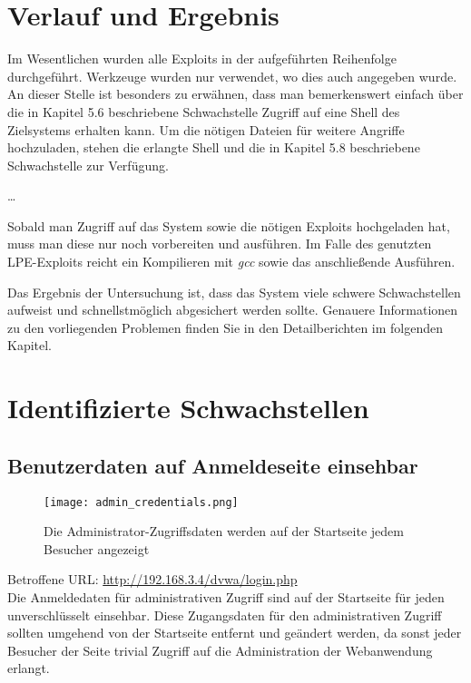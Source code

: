 \documentclass[a4paper, 12pt]{report}
\begin{document}
\chapter{Verlauf und Ergebnis}
Im Wesentlichen wurden alle Exploits in der aufgeführten Reihenfolge durchgeführt.
Werkzeuge wurden nur verwendet, wo dies auch angegeben wurde.
An dieser Stelle ist besonders zu erwähnen, dass man bemerkenswert einfach über die
in Kapitel 5.6 beschriebene Schwachstelle Zugriff auf eine Shell des Zielsystems erhalten kann.
Um die nötigen Dateien für weitere Angriffe hochzuladen, stehen die erlangte Shell
und die in Kapitel 5.8 beschriebene Schwachstelle zur Verfügung.

\ldots

Sobald man Zugriff auf das System sowie die nötigen Exploits hochgeladen hat, muss man diese nur noch vorbereiten und ausführen.
Im Falle des genutzten \ac{LPE}-Exploits reicht ein Kompilieren mit \emph{gcc} sowie das anschließende Ausführen.

Das Ergebnis der Untersuchung ist, dass das System viele schwere Schwachstellen aufweist und schnellstmöglich abgesichert werden sollte.
Genauere Informationen zu den vorliegenden Problemen finden Sie in den Detailberichten im folgenden Kapitel.


\chapter{Identifizierte Schwachstellen}
\section{Benutzerdaten auf Anmeldeseite einsehbar}

\begin{figure}
    \texttt{[image: admin\_credentials.png]}
    \caption{Die Administrator-Zugriffsdaten werden auf der Startseite jedem Besucher angezeigt}
\end{figure}

Betroffene URL: \url{http://192.168.3.4/dvwa/login.php} \\
Die Anmeldedaten für administrativen Zugriff sind auf der Startseite für jeden unverschlüsselt einsehbar.
Diese Zugangsdaten für den administrativen Zugriff sollten umgehend von der Startseite entfernt und geändert werden, da sonst jeder Besucher der Seite trivial
Zugriff auf die Administration der Webanwendung erlangt.
\end{document}

